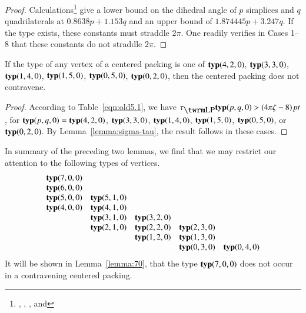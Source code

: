 \begin{proof}
Calculations\footnote{, ,
, and } give a lower bound on the
dihedral angle of $p$ simplices and $q$ quadrilaterals at
$0.8638p+1.153 q$ and an upper bound of $1.874445 p + 3.247 q$. If
the type exists, these constants must straddle $2\pi$. One readily
verifies in Cases 1--8 that these constants do not straddle
$2\pi$.
\end{proof}

\begin{lemma}
    \label{lemma:pq-types}
If the type of any vertex of a centered packing is one of
${\operatorname{\bf typ}}{(4,2,0)}$, ${\operatorname{\bf typ}}{(3,3,0)}$, ${\operatorname{\bf typ}}{(1,4,0)}$, ${\operatorname{\bf typ}}{(1,5,0)}$, ${\operatorname{\bf typ}}{(0,5,0)}$, ${\operatorname{\bf typ}}{(0,2,0)}$, %
then the centered packing does not contravene.
\end{lemma}


\begin{proof}  According to Table~\ref{eqn:old5.1},
we have $\tlp\pqr{(p,q,0)}> \squander$, for ${\operatorname{\bf typ}}{(p,q,0)} = {\operatorname{\bf typ}}{(4,2,0)}$, ${\operatorname{\bf typ}}{(3,3,0)}$,
${\operatorname{\bf typ}}{(1,4,0)}$, ${\operatorname{\bf typ}}{(1,5,0)}$, ${\operatorname{\bf typ}}{(0,5,0)}$, or ${\operatorname{\bf typ}}{(0,2,0)}$. By
Lemma~\ref{lemma:sigma-tau}, the result follows in these cases.
\end{proof}



\begin{remark} \label{rem:pq-list}
In summary of the preceding two lemmas, we find that we may
restrict our attention to the following types of vertices.
    $$
    \begin{matrix}
   {\operatorname{\bf typ}}{(7,0,0)}&      &       &       &       \\
   {\operatorname{\bf typ}}{(6,0,0)}&      &       &       &       \\
   {\operatorname{\bf typ}}{(5,0,0)}&{\operatorname{\bf typ}}{(5,1,0)} &       &       &       \\
   {\operatorname{\bf typ}}{(4,0,0)}&{\operatorname{\bf typ}}{(4,1,0)} &       &       &       \\
        &{\operatorname{\bf typ}}{(3,1,0)} &{\operatorname{\bf typ}}{(3,2,0)}  &       &       \\
        &{\operatorname{\bf typ}}{(2,1,0)} &{\operatorname{\bf typ}}{(2,2,0)}  &{\operatorname{\bf typ}}{(2,3,0)}  &       \\
        &      &{\operatorname{\bf typ}}{(1,2,0)}  &{\operatorname{\bf typ}}{(1,3,0)}  &       \\
        &      &       &{\operatorname{\bf typ}}{(0,3,0)}  &{\operatorname{\bf typ}}{(0,4,0)}  \\
    \end{matrix}
    $$
It will be shown in Lemma~\ref{lemma:70}, that the type ${\operatorname{\bf typ}}{(7,0,0)}$
does not occur in a contravening centered packing.
\end{remark}

